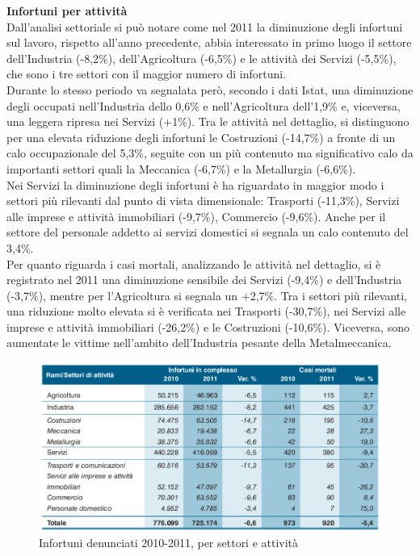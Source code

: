 \textbf{Infortuni per attività}\\
Dall'analisi settoriale si può notare come nel 2011 la diminuzione degli infortuni sul lavoro, rispetto all'anno precedente, abbia interessato in primo luogo il settore dell'Industria (-8,2\%), dell'Agricoltura (-6,5\%) e le attività dei Servizi (-5,5\%), che sono i tre settori con il maggior numero di infortuni.\\
Durante lo stesso periodo va segnalata però, secondo i dati Istat, una diminuzione degli occupati nell'Industria dello 0,6\% e nell'Agricoltura dell'1,9\% e, viceversa, una leggera ripresa nei Servizi (+1\%). 
Tra le attività nel dettaglio, si distinguono per una elevata riduzione degli infortuni le Costruzioni (-14,7\%) a fronte di un calo occupazionale del 5,3\%, seguite con un più contenuto ma significativo calo da importanti settori quali la Meccanica (-6,7\%) e la
Metallurgia (-6,6\%).\\
Nei Servizi la diminuzione degli infortuni è ha riguardato in maggior modo i settori più rilevanti dal punto di vista dimensionale: Trasporti (-11,3\%), Servizi alle imprese e attività immobiliari (-9,7\%), Commercio (-9,6\%). Anche per il settore del personale addetto
ai servizi domestici si segnala un calo contenuto del 3,4\%.\\
Per quanto riguarda i casi mortali, analizzando le attività nel dettaglio, si è registrato nel 2011 una diminuzione sensibile dei Servizi (-9,4\%) e dell'Industria (-3,7\%), mentre per l'Agricoltura si segnala un +2,7\%. Tra i settori più rilevanti, una riduzione molto elevata
si è verificata nei Trasporti (-30,7\%), nei Servizi alle imprese e attività immobiliari (-26,2\%) e le Costruzioni (-10,6\%). Viceversa, sono aumentate le vittime nell'ambito dell'Industria pesante della Metalmeccanica.\\


\begin{figure}[H]
\centering
\includegraphics[scale=0.5]{images/cap4/analisiDiMercato/infortuniPerGestione2}
\caption{Infortuni denunciati 2010-2011, per settori e attività}
\end{figure}








